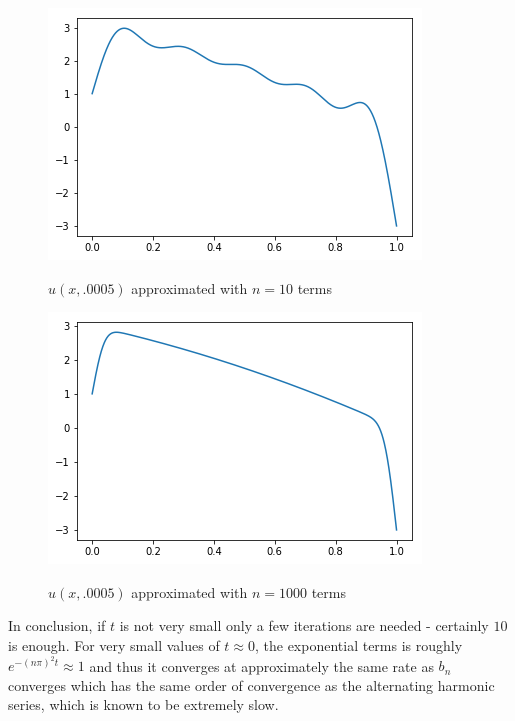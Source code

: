 \documentclass[12pt]{article}
\begin{document}
\begin{figure}[H]
	\caption{$u(x,.0005)$ approximated with $n=10$ terms}
	\includegraphics[width=.5\textwidth]{tk01_figure_7_cross10}
	\label{fig2}
	\centering
\end{figure}
\begin{figure}[H]
	\caption{$u(x,.0005)$ approximated with $n=1000$ terms}
	\includegraphics[width=.5\textwidth]{tk01_figure_8_cross1000}
	\label{fig2}
	\centering
\end{figure}

In conclusion, if $t$ is not very small only a few iterations are needed - certainly $10$ is enough. For very small values of $t \approx 0$, the exponential terms is roughly $e^{-(n \pi)^2t} \approx 1$ and thus it converges at approximately the same rate as $b_n$ converges which has the same order of convergence as the alternating harmonic series, which is known to be extremely slow.
\end{document}
